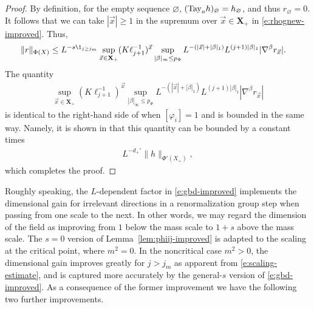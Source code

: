 \begin{proof}
By definition, for the empty sequence $\varnothing$, $({\rm Tay}_a h)_\varnothing = h_\varnothing$,
and thus $r_\varnothing = 0$.
It follows that we can take $|\vec x| \geq 1$ in the supremum over ${\vec x} \in \mathbf{X}_+$ in
\eqref{e:rhognew-improved}. Thus,
\begin{align}
    \|r\|_{\Phi (X)}
    & \le
    L^{-s \1_{{j\geq j_m}}}
    \sup_{{\vec x} \in {\mathbf X}_+}
    (K\ell_{j+1}^{-1})^{\vec x}
    \sup_{|\beta|_\infty \le p_\Phi}
    L^{-(|\vec x| +|\beta|_1)}
    L^{(j+1) |\beta|_1}
    | \nabla^\beta  r_{{\vec x}}  |.
\end{align}
The quantity
\begin{align}
\label{e:rhognew}
    \sup_{{\vec x} \in {\mathbf X}_+}
    (K\ell_{j+1}^{-1})^{\vec x}
    \sup_{|\beta|_\infty \le p_\Phi}
    L^{-(|\vec x| +|\beta|_1)}
    L^{(j+1) |\beta|_1}
    | \nabla^\beta  r_{{\vec x}}  |
\end{align}
is identical to the right-hand side of \cite[\eqref{loc-e:rhognew}]{BS-rg-loc}
when $[\varphi_i] = 1$ and is bounded in the same way. Namely, it is shown in
\cite{BS-rg-loc} that this quantity can be bounded by a constant times
\begin{align}
    L^{-d_{+}'}
    \|h\|_{\Phi'( X_+)},
\end{align}
which completes the proof.
\end{proof}

Roughly speaking, the $L$-dependent factor in \eqref{e:gbd-improved} implements the dimensional gain
for irrelevant directions in a renormalization group step when passing from one scale to the next.
In other words, we may regard the dimension of the field as improving from $1$ below the
mass scale to $1+s$ above the mass scale.
The $s=0$ version of Lemma~\ref{lem:phiij-improved} is adapted to the scaling at the critical point, where $m^2=0$.
In the noncritical case $m^2>0$, the dimensional gain improves greatly for $j>j_m$
as apparent from \eqref{e:scaling-estimate}, and is
captured more accurately by the general-$s$ version of \eqref{e:gbd-improved}.
As a consequence of the former improvement we have the following two further improvements.

